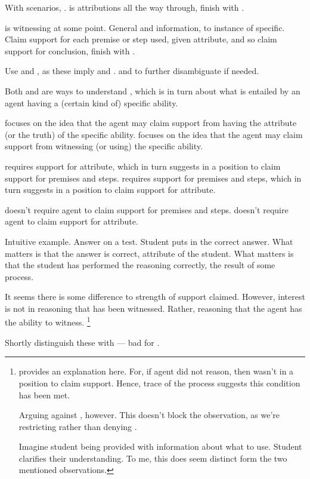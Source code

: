 \begin{note}
  With scenarios, \gsi{}.
  \AR{} is attributions all the way through, finish with \PA{}.

  \WR{} is witnessing at some point.
  General and information, to instance of specific.
  Claim support for each premise or step used, given attribute, and so claim support for conclusion, finish with \PW{}.
\end{note}

\begin{note}[Terminology]
  Use \AR{} and \WR{}, as these imply \PA{} and \PW{}.
  \PA{} and \PW{} to further disambiguate if needed.
\end{note}

\begin{note}
  Both \AR{} and \WR{} are ways to understand \aben{}, which is in turn about what is entailed by an agent having a (certain kind of) specific ability.

  \AR{} focuses on the idea that the agent may claim support from having the attribute (or the truth) of the specific ability.
  \WR{} focuses on the idea that the agent may claim support from witnessing (or using) the specific ability.

  \AR{} requires support for attribute, which in turn suggests in a position to claim support for premises and steps.
  \WR{} requires support for premises and steps, which in turn suggests in a position to claim support for attribute.

  \AR{} doesn't require agent to claim support for premises and steps.
  \WR{} doesn't require agent to claim support for attribute.

  Intuitive example.
  Answer on a test.
  Student puts in the correct answer.
  What matters is that the answer is correct, attribute of the student.
  What matters is that the student has performed the reasoning correctly, the result of some process.

  It seems there is some difference to strength of support claimed.
  However, interest is not in reasoning that has been witnessed.
  Rather, reasoning that the agent has the ability to witness.\nolinebreak
  \footnote{
    \uRa{} provides an explanation here.
    For, if agent did not reason, then wasn't in a position to claim support.
    Hence, trace of the process suggests this condition has been met.

    Arguing against \uRa{}, however.
    This doesn't block the observation, as we're restricting \uRa{} rather than denying \uRa{}.

    Imagine student being provided with information about what to use.
    Student clarifies their understanding.
    To me, this does seem distinct form the two mentioned observations.
  }

  Shortly distinguish these with \uRa{} --- bad for \WR{}.
\end{note}

